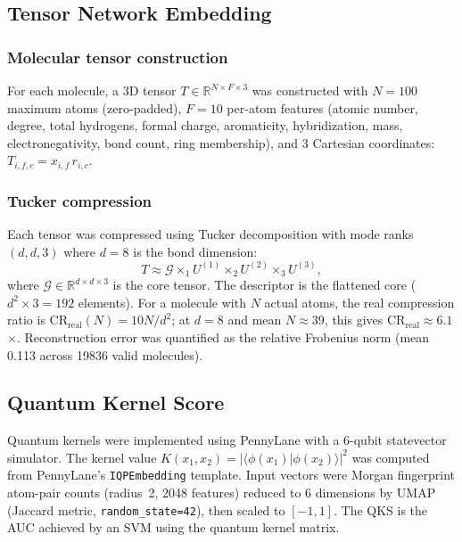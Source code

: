 \documentclass[11pt,a4paper]{article}
\begin{document}
\subsection{Tensor Network Embedding}

\subsubsection{Molecular tensor construction}

For each molecule, a 3D tensor $T \in \mathbb{R}^{N \times F \times 3}$ was constructed with $N = 100$ maximum atoms (zero-padded), $F = 10$ per-atom features (atomic number, degree, total hydrogens, formal charge, aromaticity, hybridization, mass, electronegativity, bond count, ring membership), and 3 Cartesian coordinates: $T_{i,f,c} = x_{i,f} \, r_{i,c}$.

\subsubsection{Tucker compression}

Each tensor was compressed using Tucker decomposition \citep{tensorly_2019} with mode ranks $(d, d, 3)$ where $d = 8$ is the bond dimension:
\begin{equation}
T \approx \mathcal{G} \times_1 U^{(1)} \times_2 U^{(2)} \times_3 U^{(3)},
\end{equation}
where $\mathcal{G} \in \mathbb{R}^{d \times d \times 3}$ is the core tensor. The descriptor is the flattened core ($d^2 \times 3 = 192$ elements). For a molecule with $N$ actual atoms, the real compression ratio is $\mathrm{CR}_{\text{real}}(N) = 10N / d^2$; at $d = 8$ and mean $N \approx 39$, this gives $\mathrm{CR}_{\text{real}} \approx \num{6.1}$$\times$. Reconstruction error was quantified as the relative Frobenius norm (mean \num{0.113} across \num{19836} valid molecules).

\subsection{Quantum Kernel Score}

Quantum kernels were implemented using PennyLane \citep{pennylane_2024} with a 6-qubit statevector simulator. The kernel value $K(x_1, x_2) = |\langle \phi(x_1) | \phi(x_2) \rangle|^2$ was computed from PennyLane's \texttt{IQPEmbedding} template. Input vectors were Morgan fingerprint atom-pair counts (radius~2, \num{2048} features) reduced to 6 dimensions by UMAP (Jaccard metric, \texttt{random\_state=42}), then scaled to $[-1, 1]$. The QKS is the AUC achieved by an SVM using the quantum kernel matrix.
\end{document}
